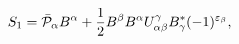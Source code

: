 \begin{equation}\label{4.32}
S_1=\bar{\cal P}_\alpha B^\alpha+\frac{1}{2}B^\beta
B^\alpha U^\gamma_{\alpha\beta}
B^*_\gamma(-1)^{\varepsilon_\beta},
\end{equation}

